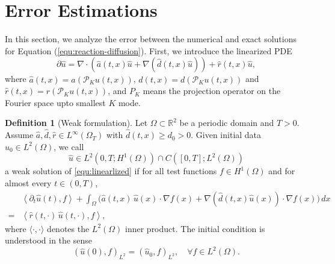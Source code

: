 \documentclass[preprint,12pt]{elsarticle}
\theoremstyle{definition}
\newtheorem{definition}[theorem]{Definition}
\theoremstyle{remark}
\begin{document}
\section{Error Estimations}
In this section, we analyze the error between the numerical and exact solutions for Equation (\ref{equ:reaction-diffusion}). First, we introduce the linearized PDE 
\begin{equation}\label{equ:linearlized}
    \partial \hat u  = \nabla \cdot \left( \hat{a}(t,x) \hat u + \nabla(\hat d(t,x)\hat u)\right) + \hat r(t,x) \hat u, 
\end{equation}
where $\hat a(t,x) = a (\mathcal P_K u(t,x))$, $\hat d(t,x) = d (\mathcal P_K u(t,x))$ and $\hat r(t,x) = r (\mathcal P_K u(t,x))$, and $P_K$ means the projection operator on the Fourier space upto smallest $K$ mode.
\begin{definition}[Weak formulation]
Let $\Omega\subset\mathbb{R}^2$ be a periodic domain and $T>0$.  
Assume $\hat a,\hat d,\hat r \in L^\infty(\Omega_T)$ with $\hat d(t,x)\ge d_0>0$.  
Given initial data $\hat u_0 \in L^2(\Omega)$, we call 
\[
\hat u \in L^2(0,T;H^1(\Omega)) \cap C([0,T];L^2(\Omega))
\]
a weak solution of \eqref{equ:linearlized} if for all test functions $f \in H^1(\Omega)$ and for almost every $t\in (0,T)$,
\begin{equation}\label{eq:weak-evans}
\begin{aligned}
    &\left\langle\partial_t \hat u(t), f\right\rangle+ \int_\Omega \big( \hat a(t,x)\,\hat u (x)\cdot \nabla f(x) 
+ \nabla (\hat d(t,x) \hat u (x))\cdot \nabla f(x) \big)\,dx \\
=& \left\langle\hat r(t,\cdot)\,\hat u(t,\cdot), f\right\rangle,
\end{aligned}
\end{equation}
where $\langle\cdot,\cdot\rangle$ denotes the $L^2(\Omega)$ inner product.
The initial condition is understood in the sense
\[
(\hat u(0), f)_{L^2} = (\hat u_0, f)_{L^2}, \quad \forall f\in L^2(\Omega).
\]
\end{definition}
\end{document}
